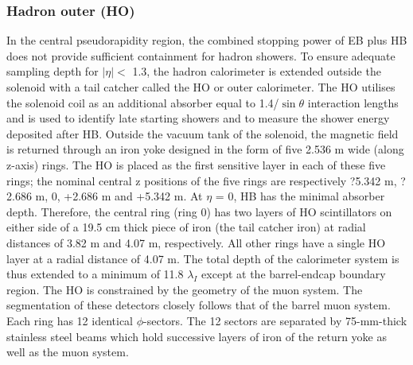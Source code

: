 \subsubsection{Hadron outer (HO)}
In the central pseudorapidity region, the combined stopping power of EB plus HB does not provide sufficient containment for hadron showers. To ensure adequate sampling depth for $|\eta|<$ 1.3, the hadron calorimeter is extended outside the solenoid with a tail catcher called the HO or outer calorimeter. The HO utilises the solenoid coil as an additional absorber equal to 1.4/$\sin \theta$ interaction lengths and is used to identify late starting showers and to measure the shower energy deposited after HB.
Outside the vacuum tank of the solenoid, the magnetic field is returned through an iron yoke designed in the form of five 2.536 m wide (along z-axis) rings. The HO is placed as the first sensitive layer in each of these five rings; the nominal central z positions of the five rings are respectively ?5.342 m, ?2.686 m, 0, +2.686 m and +5.342 m. At $\eta$ = 0, HB has the minimal absorber depth. Therefore, the central ring (ring 0) has two layers of HO scintillators on either side of a 19.5 cm thick piece of iron (the tail catcher iron) at radial distances of 3.82 m and 4.07 m, respectively. All other rings have a single HO layer at a radial distance of 4.07 m. The total depth of the calorimeter system is thus extended to a minimum of 11.8 $\lambda_{I}$ except at the barrel-endcap boundary region. The HO is constrained by the geometry of the muon system. The segmentation of these detectors closely follows that of the barrel muon system. Each ring has 12 identical $\phi$-sectors. The 12 sectors are separated by 75-mm-thick stainless steel beams which hold successive layers of iron of the return yoke as well as the muon system. 

